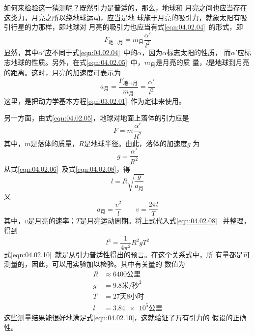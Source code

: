 如何来检验这一猜测呢？既然引力是普适的，那么，地球和
月亮之间也应当存在这类力，月亮之所以绕地球运动，应当是地
球施于月亮的吸引力，就象太阳有吸引行星的力那样，即地球对
月亮的吸引力也应当有式\eqref{eqn:04.02.04}~的形式，即
\begin{equation}\label{eqn:04.02.05}
	F _ { \text{地} \to \text{月}} = m _ {\text{月}} \frac { \alpha ' } { l ^ { 2 } }  
\end{equation}
显然，其中$ \alpha ' $应不同于式\eqref{eqn:04.02.04}~中的$ \alpha $，因为$ \alpha $标志太阳的性质，
而$ \alpha ' $应标志地球的性质。另外，在式\eqref{eqn:04.02.05}~中，$ m _ {\text{月}} $是月亮的质
量，$ l $是地球到月亮的距离。这时，月亮的加速度可表示为
\begin{equation}\label{eqn:04.02.06}
	a _ { \text{月} } = \frac { F _ { \text{地} \to \text{月}} } { m _ {\text{月}} } = \frac { \alpha ' } { l ^ { 2 } }  
\end{equation}
这里，是把动力学基本方程\eqref{eqn:03.02.01}~作为定律来使用。

另一方面，由式\eqref{eqn:04.02.05}，地球对地面上落体的引力应是
\begin{equation}\label{eqn:04.02.07}
	F = m \frac { \alpha ' }  { R ^ { 2 } }  
\end{equation}
其中，$ m $是落体的质量，$ R $是地球半径。由此，落体的加速度$ g $
为
\begin{equation}\label{eqn:04.02.08}
	g = \frac { \alpha ' } { R ^ { 2 } }  
\end{equation}
从式\eqref{eqn:04.02.06}~及式\eqref{eqn:04.02.08}，得
\begin{equation}\label{eqn:04.02.09}
	l = R \sqrt { { \frac { g } { a _ { \text{月} } }} }
\end{equation} 
又
\begin{equation*}
	a _ { \text{月} } = \frac { v ^ { 2 } } { l } \qquad  
v = \frac { 2 \pi l } { T } 
\end{equation*}
其中，$ v $是月亮的速率；$ T $是月亮运动周期。将上式代入式\eqref{eqn:04.02.08}~
并整理，得到
\begin{equation}\label{eqn:04.02.10}
	l ^ { 3 } = \frac { 1 } { 4 \pi ^ { 2 } } R ^ { 2 } g T ^ { 2 } 
\end{equation}
式\eqref{eqn:04.02.10}~就是从引力普适性得出的预言。在这个关系式中，所
有量都是可测量的，因此，可以用实验加以检验。其中有关量的
数值为
\begin{align*}
	R &\approx  6400 \text{公里} \\
	g &=  9.8 \text{米/秒} ^ 2 \\
	T &=  27 \text{天}8\text{小时} \\
	l &=  \num{3.84e5} \text{公里}
\end{align*}
这些测量结果能很好地满足式\eqref{eqn:04.02.10}，这就验证了万有引力的
假设的正确性。

